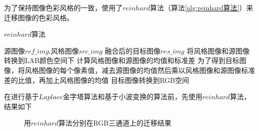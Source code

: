 \documentclass[a4paper, 11pt]{article}
\begin{document}
为了保持图像色彩风格的一致，使用了$reinhard$算法（算法\ref{alg:reinhard算法}）来迁移图像的色彩风格。
\begin{algorithm}[H]
\caption{$reinhard$算法}  
\label{alg:reinhard算法}  
\begin{algorithmic}[1]
    \REQUIRE 源图像$ref\_img$,风格图像$src\_img$
    \ENSURE 融合后的目标图像$res\_img$
    \STATE 将风格图像和源图像转换到LAB颜色空间下
    \STATE 计算风格图像和源图像的均值和标准差
    \STATE 为了得到目标图像，将风格图像的每个像素值，减去源图像的均值然后乘以风格图像和源图像标准差的比值，再加上风格图像的均值
    \STATE 目标图像转换到RGB空间
\end{algorithmic}  
\end{algorithm}

在进行基于$Laplace$金字塔算法和基于小波变换的算法前，先使用$reinhard$算法，结果如下
\begin{figure}[H]
    \centering
    \hspace{0.1 in}
    \hspace{0.1in}
\caption{用$reinhard$算法分别在RGB三通道上的迁移结果}
\label{fig:用$reinhard$算法分别在RGB三通道上的迁移结果} 
\end{figure}
\end{document}
